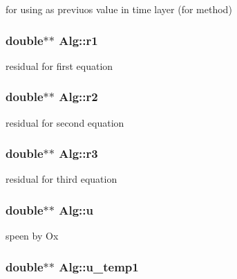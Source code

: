 \label{classAlg_aa6628cd62bd2c1e14311dada7d35ed6e}
for using as previuos value in time layer (for method) \hypertarget{classAlg_ac6058a59828b5bb89532f37d84f4dfc2}{
\subsubsection[{r1}]{\setlength{\rightskip}{0pt plus 5cm}double$\ast$$\ast$ {\bf Alg::r1}}}
\label{classAlg_ac6058a59828b5bb89532f37d84f4dfc2}
residual for first equation \hypertarget{classAlg_a5ca3705a31dd0a0f8e9e3b2455b63f3d}{
\subsubsection[{r2}]{\setlength{\rightskip}{0pt plus 5cm}double$\ast$$\ast$ {\bf Alg::r2}}}
\label{classAlg_a5ca3705a31dd0a0f8e9e3b2455b63f3d}
residual for second equation \hypertarget{classAlg_af62c56e11f6523097ab3e1817da8453d}{
\subsubsection[{r3}]{\setlength{\rightskip}{0pt plus 5cm}double$\ast$$\ast$ {\bf Alg::r3}}}
\label{classAlg_af62c56e11f6523097ab3e1817da8453d}
residual for third equation \hypertarget{classAlg_a2f0a5afa848c3bfb1d8153e62aa434f6}{
\subsubsection[{u}]{\setlength{\rightskip}{0pt plus 5cm}double$\ast$$\ast$ {\bf Alg::u}}}
\label{classAlg_a2f0a5afa848c3bfb1d8153e62aa434f6}
speen by Ox \hypertarget{classAlg_ad60a4d85f33f58e39e026e608d8f3aa3}{
\subsubsection[{u\_\-temp1}]{\setlength{\rightskip}{0pt plus 5cm}double$\ast$$\ast$ {\bf Alg::u\_\-temp1}}}
